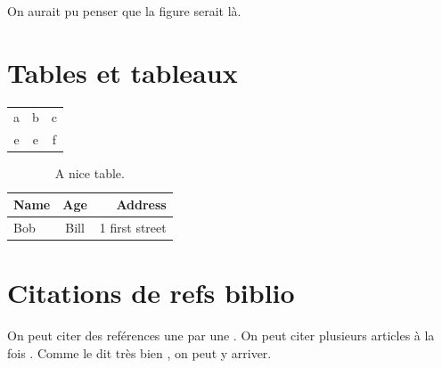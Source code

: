 On aurait pu penser que la figure serait là.
\blindtext[2]

\section{Tables et tableaux}

\begin{tabular}{ccc}
    a & b & c \\
    e & e & f
\end{tabular}

\begin{table}[]
    \caption{A nice table.}
    \label{tab:nice_table}
    \begin{center}
        \begin{tabular}{@{}lcr@{}}
            \toprule
            Name & Age & Address \\
            \midrule
            Bob & Bill  & 1 first street \\
            \bottomrule
        \end{tabular}
    \end{center}
    
\end{table}


\section{Citations de refs biblio}

On peut citer des reférences une par une \citep{hawking1974black}. 
On peut citer plusieurs articles à la fois \citep{belczynski2012missing,hawking1974black}.
Comme le dit très bien \citeauthor{belczynski2012missing}, on peut y arriver.
